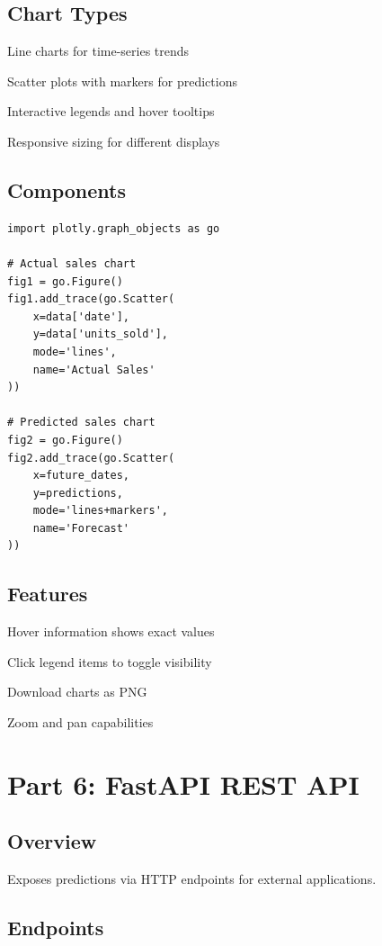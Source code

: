 \documentclass{article}
\begin{document}
\subsection{Chart Types}

Line charts for time-series trends

Scatter plots with markers for predictions

Interactive legends and hover tooltips

Responsive sizing for different displays

\subsection{Components}

\begin{verbatim}
import plotly.graph_objects as go

# Actual sales chart
fig1 = go.Figure()
fig1.add_trace(go.Scatter(
    x=data['date'],
    y=data['units_sold'],
    mode='lines',
    name='Actual Sales'
))

# Predicted sales chart
fig2 = go.Figure()
fig2.add_trace(go.Scatter(
    x=future_dates,
    y=predictions,
    mode='lines+markers',
    name='Forecast'
))
\end{verbatim}

\subsection{Features}

Hover information shows exact values

Click legend items to toggle visibility

Download charts as PNG

Zoom and pan capabilities

\section{Part 6: FastAPI REST API}

\subsection{Overview}

Exposes predictions via HTTP endpoints for external applications.

\subsection{Endpoints}
\end{document}
